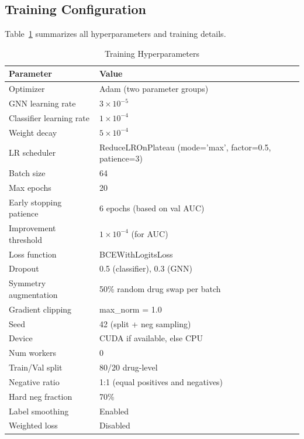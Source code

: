 \documentclass[conference]{IEEEtran}
\begin{document}
\subsection{Training Configuration}
Table~\ref{tab:training} summarizes all hyperparameters and training details.

\begin{table}[htbp]
\caption{Training Hyperparameters}
\label{tab:training}
\centering
\begin{tabular}{@{}ll@{}}
\toprule
\textbf{Parameter} & \textbf{Value} \\
\midrule
Optimizer               & Adam (two parameter groups) \\
GNN learning rate       & $3 \times 10^{-5}$ \\
Classifier learning rate & $1 \times 10^{-4}$ \\
Weight decay            & $5 \times 10^{-4}$ \\
LR scheduler            & ReduceLROnPlateau (mode='max', factor=0.5, patience=3) \\
Batch size              & 64 \\
Max epochs              & 20 \\
Early stopping patience & 6 epochs (based on val AUC) \\
Improvement threshold   & $1 \times 10^{-4}$ (for AUC) \\
Loss function           & BCEWithLogitsLoss \\
Dropout                 & 0.5 (classifier), 0.3 (GNN) \\
Symmetry augmentation   & 50\% random drug swap per batch \\
Gradient clipping       & max\_norm = 1.0 \\
Seed                    & 42 (split + neg sampling) \\
Device                  & CUDA if available, else CPU \\
Num workers             & 0 \\
Train/Val split         & 80/20 drug-level \\
Negative ratio          & 1:1 (equal positives and negatives) \\
Hard neg fraction       & 70\% \\
Label smoothing         & Enabled \\
Weighted loss           & Disabled \\
\bottomrule
\end{tabular}
\end{table}
\end{document}
